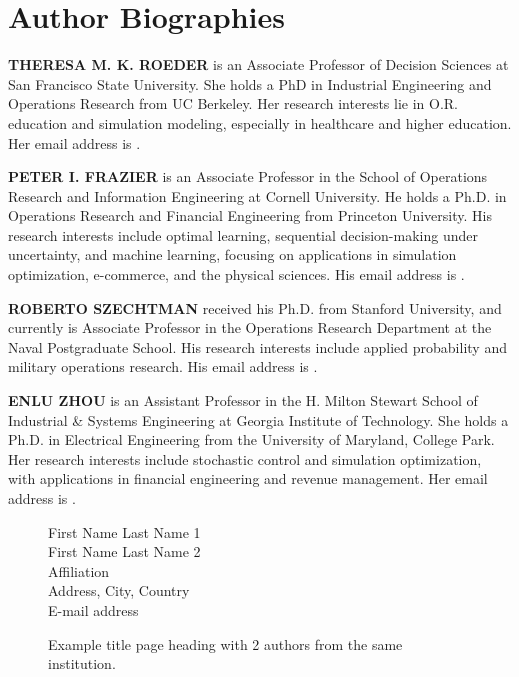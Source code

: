 \documentclass{scspaperproc}
\theoremstyle{scsthe}
\begin{document}
\maketitle






\section*{Author Biographies}

\textbf{\uppercase{THERESA M. K. ROEDER}} is an Associate Professor of Decision Sciences at San Francisco State University. She holds a PhD in Industrial Engineering and Operations Research from UC Berkeley. Her research interests lie in O.R. education and simulation modeling, especially in healthcare and higher education. Her email address is .

\textbf{\uppercase{PETER I. FRAZIER}} is an Associate Professor in the School of Operations Research and Information Engineering at Cornell University. He holds a Ph.D. in Operations Research and Financial Engineering from Princeton University. His research interests include optimal learning, sequential decision-making under uncertainty, and machine learning, focusing on applications in simulation optimization, e-commerce, and the physical sciences.  His email address is .

\textbf{\uppercase{ROBERTO SZECHTMAN}} received his Ph.D. from Stanford University, and currently is Associate Professor in the Operations Research Department at the Naval Postgraduate School. His research interests include applied probability and military operations research. His email address is .

\textbf{\uppercase{ENLU ZHOU}} is an Assistant Professor in the H. Milton Stewart School of Industrial \& Systems Engineering at Georgia Institute of Technology. She holds a Ph.D. in Electrical Engineering from the University of Maryland, College Park. Her research interests include stochastic control and simulation optimization, with applications in financial engineering and revenue management. Her email address is .

\newpage

\begin{figure*}[htb]
{
\centering
First Name Last Name 1 \\
First Name Last Name 2 \\
\vspace{12pt}
Affiliation \\
Address, City, Country \\
E-mail address
\caption{Example title page heading with 2 authors from the same institution.\label{fig2same}}
}
\end{figure*}
\end{document}
